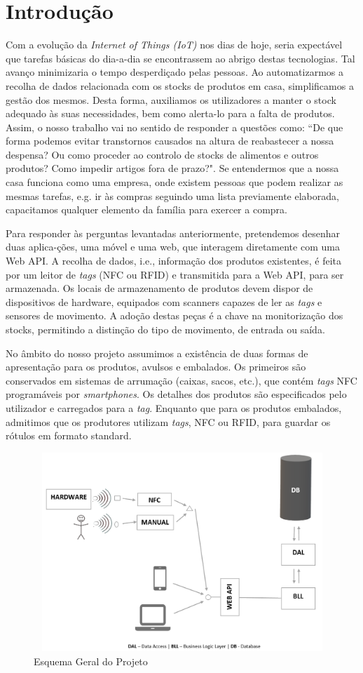 %
%
\section*{Introdução} \label{Introducao}

Com a evolução da \textit{Internet of Things (IoT)} nos dias de hoje, seria expectável que tarefas básicas do dia-a-dia se encontrassem ao abrigo destas tecnologias. Tal avanço minimizaria o tempo desperdiçado pelas pessoas. Ao automatizarmos a recolha de dados relacionada com os stocks de produtos em casa, simplificamos a gestão dos mesmos. Desta forma, auxiliamos os utilizadores a manter o stock adequado às suas necessidades, bem como alerta-lo para a falta de produtos. Assim, o nosso trabalho vai no sentido de responder a questões como: ``De que forma podemos evitar transtornos causados na altura de reabastecer a nossa despensa? Ou como proceder ao controlo de stocks de alimentos e outros produtos? Como impedir artigos fora de prazo?". Se entendermos que a nossa casa funciona como uma empresa, onde existem pessoas que podem realizar as mesmas tarefas, e.g. ir às compras seguindo uma lista previamente elaborada, capacitamos qualquer elemento da família para exercer a compra.

Para responder às perguntas levantadas anteriormente, pretendemos desenhar duas aplica-ções, uma móvel e uma web, que interagem diretamente com uma Web API. A recolha de dados, i.e., informação dos produtos existentes, é feita por um leitor de {\itshape tags} (NFC ou RFID) e transmitida para a Web API, para ser armazenada. Os locais de armazenamento de produtos devem dispor de dispositivos de hardware, equipados com scanners capazes de ler as {\itshape tags} e sensores de movimento. A adoção destas peças é a chave na monitorização dos stocks, permitindo a distinção do tipo de movimento, de entrada ou saída.

No âmbito do nosso projeto assumimos a existência de duas formas de apresentação para os produtos, avulsos e embalados. Os primeiros são conservados em sistemas de arrumação (caixas, sacos, etc.), que contém {\itshape tags} NFC programáveis por {\itshape smartphones}. Os detalhes dos produtos são especificados pelo utilizador e carregados para a {\itshape tag}. Enquanto que para os produtos embalados, admitimos que os produtores utilizam {\itshape tags}, NFC ou RFID, para guardar os rótulos em formato standard.


\vspace{-15mm}
\hspace{2mm}

\begin{figure}[h!]
	\includegraphics[width=14cm,height=7.5cm,scale=0.5]{./figures/Esquema_Estrutura_Projeto_Geral.png}
	\caption{Esquema Geral do Projeto}
	\label{esquema_geral}
\end{figure}

